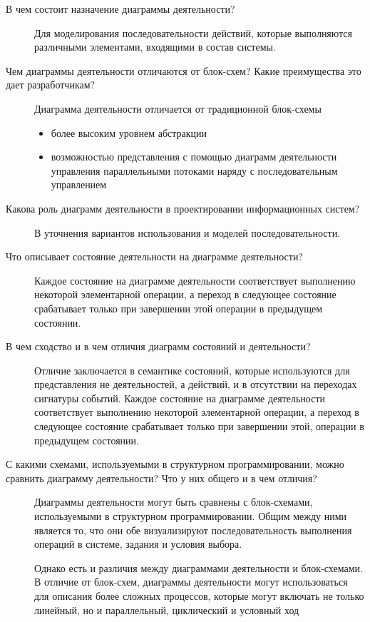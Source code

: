 \begin{description}
	\item [В чем состоит назначение диаграммы деятельности?]
		Для моделирования последовательности действий, которые выполняются
		различными элементами, входящими в состав системы.
	\item [Чем диаграммы деятельности отличаются от блок-схем? Какие
		преимущества это дает разработчикам?]
		Диаграмма деятельности отличается от традиционной блок-схемы
		\begin{itemize}
			\item более высоким уровнем абстракции
			\item возможностью представления с помощью диаграмм деятельности
				управления параллельными потоками наряду с последовательным
				управлением
		\end{itemize}
	\item [Какова роль диаграмм деятельности в проектировании
		информационных систем?]
		В уточнения вариантов использования и моделей последовательности.
	\item [Что описывает состояние деятельности на диаграмме деятельности?]
		Каждое состояние на диаграмме деятельности соответствует выполнению
		некоторой элементарной операции, а переход в следующее состояние
		срабатывает только при завершении этой операции
		в предыдущем состоянии.
	\item [В чем сходство и в чем отличия диаграмм состояний и деятельности?]
		Отличие заключается в семантике состояний, которые используются
		для представления не деятельностей, а действий, и в отсутствии на
		переходах сигнатуры событий. Каждое состояние на диаграмме
		деятельности соответствует выполнению некоторой элементарной операции,
		а переход в следующее состояние срабатывает только при завершении
		этой, операции в предыдущем состоянии.
	\item [С какими схемами, используемыми в структурном программировании,
		можно сравнить диаграмму деятельности?
		Что у них общего и в чем отличия?]
		Диаграммы деятельности могут быть сравнены с блок-схемами,
		используемыми в структурном программировании. Общим между ними
		является то, что они обе визуализируют последовательность выполнения
		операций в системе, задания и условия выбора. \par
		Однако есть и различия между диаграммами деятельности и блок-схемами.
		В отличие от блок-схем, диаграммы деятельности могут использоваться
		для описания более сложных процессов, которые могут включать
		не только линейный, но и параллельный, циклический и условный ход

\end{description}
